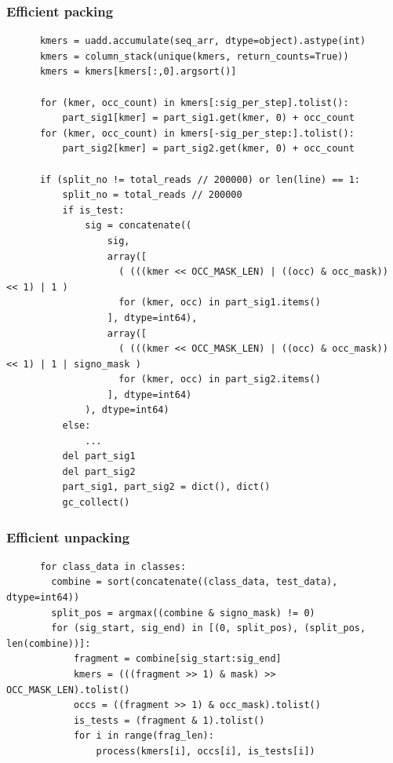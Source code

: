 \begin{frame}[fragile]
  \frametitle{Efficient packing}

  \begin{verbatim}
      kmers = uadd.accumulate(seq_arr, dtype=object).astype(int)
      kmers = column_stack(unique(kmers, return_counts=True))      
      kmers = kmers[kmers[:,0].argsort()]      

      for (kmer, occ_count) in kmers[:sig_per_step].tolist():
          part_sig1[kmer] = part_sig1.get(kmer, 0) + occ_count
      for (kmer, occ_count) in kmers[-sig_per_step:].tolist():
          part_sig2[kmer] = part_sig2.get(kmer, 0) + occ_count

      if (split_no != total_reads // 200000) or len(line) == 1:
          split_no = total_reads // 200000
          if is_test:
              sig = concatenate((
                  sig,
                  array([
                    ( (((kmer << OCC_MASK_LEN) | ((occ) & occ_mask)) << 1) | 1 )
                    for (kmer, occ) in part_sig1.items()
                  ], dtype=int64),
                  array([
                    ( (((kmer << OCC_MASK_LEN) | ((occ) & occ_mask)) << 1) | 1 | signo_mask )
                    for (kmer, occ) in part_sig2.items()
                  ], dtype=int64)
              ), dtype=int64)
          else:
              ...
          del part_sig1
          del part_sig2
          part_sig1, part_sig2 = dict(), dict()
          gc_collect()
  \end{verbatim}
\end{frame}

\begin{frame}[fragile]
  \frametitle{Efficient unpacking}

  \begin{verbatim}
      for class_data in classes:
        combine = sort(concatenate((class_data, test_data), dtype=int64))
        split_pos = argmax((combine & signo_mask) != 0)
        for (sig_start, sig_end) in [(0, split_pos), (split_pos, len(combine))]:
            fragment = combine[sig_start:sig_end]
            kmers = (((fragment >> 1) & mask) >> OCC_MASK_LEN).tolist()
            occs = ((fragment >> 1) & occ_mask).tolist()
            is_tests = (fragment & 1).tolist()
            for i in range(frag_len):
                process(kmers[i], occs[i], is_tests[i])
  \end{verbatim}
\end{frame}


